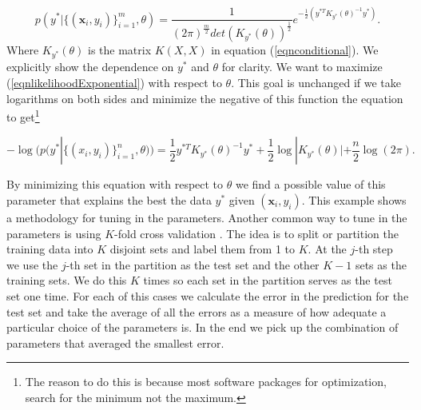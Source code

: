 \documentclass[12pt]{book}
\newcommand{\x}{\textbf{x}}
\begin{document}
\begin{equation}\label{eqnlikelihoodExponential}
p(y^{*}|\{(\x_{i},y_{i})\}_{i=1}^{m},\theta)=\frac{1}{(2\pi)^{\frac{m}{2}}det(K_{y^{*}}(\theta))^{\frac{1}{2}}}
e^{-\frac{1}{2}(y^{*T}K_{y^{*}}(\theta)^{-1}y^{*})}.
\end{equation}
Where $K_{y^{*}}(\theta)$ is the matrix $K(X,X)$ in equation (\ref{eqnconditional}). We explicitly
show the dependence on $y^{*}$ and $\theta$ for clarity. We want to maximize (\ref{eqnlikelihoodExponential})
with respect to $\theta$.
This goal is unchanged if we take logarithms on both sides and minimize the negative
of this function  the equation to get\footnote{The reason to do this is because most
software packages for optimization, search for the minimum not the maximum.}


\begin{equation}\label{eqnloglikelihood}
-\log(p(y^{*}|\{(x_{i},y_{i})\}_{i=1}^{n},\theta))=\frac{1}{2}y^{*T}K_{y^{*}}(\theta)^{-1}y^{*}+
\frac{1}{2}\log|K_{y^{*}}(\theta)|+\frac{n}{2}\log(2\pi).
\end{equation}

By minimizing this equation with respect to $\theta$ we find a possible value of this parameter
that explains the best the data $y^{*}$ given $(\x_{i},y_{i})$. This example shows a 
methodology for tuning in the parameters. Another common way to tune in the parameters
is using  $K$-fold cross validation \cite{murphy2012machine}. The idea is to split or partition
the training data into $K$ disjoint sets and label them from 1 to $K$. At the $j$-th step we use the $j$-th set in 
the partition as the test set and the other $K-1$ sets as the training sets. We do this
$K$ times so each set in the partition serves as the test set one time. For each
of this cases we calculate  the error in the prediction for the test set and take
the average of all the errors as a measure of how adequate a particular choice of 
the parameters is. In the end we pick up the combination of  parameters that
averaged the smallest error. 
\newline
\end{document}
